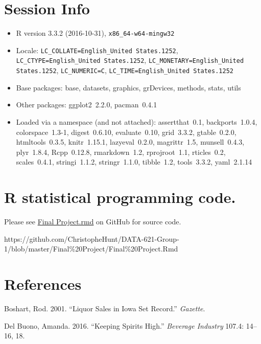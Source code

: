 \documentclass[]{elsarticle} %
\begin{document}
\section{Session Info}\label{session-info}

\begin{itemize}\raggedright
  \item R version 3.3.2 (2016-10-31), \verb|x86_64-w64-mingw32|
  \item Locale: \verb|LC_COLLATE=English_United States.1252|, \verb|LC_CTYPE=English_United States.1252|, \verb|LC_MONETARY=English_United States.1252|, \verb|LC_NUMERIC=C|, \verb|LC_TIME=English_United States.1252|
  \item Base packages: base, datasets, graphics, grDevices,
    methods, stats, utils
  \item Other packages: ggplot2~2.2.0, pacman~0.4.1
  \item Loaded via a namespace (and not attached): assertthat~0.1,
    backports~1.0.4, colorspace~1.3-1, digest~0.6.10,
    evaluate~0.10, grid~3.3.2, gtable~0.2.0, htmltools~0.3.5,
    knitr~1.15.1, lazyeval~0.2.0, magrittr~1.5, munsell~0.4.3,
    plyr~1.8.4, Rcpp~0.12.8, rmarkdown~1.2, rprojroot~1.1,
    rticles~0.2, scales~0.4.1, stringi~1.1.2, stringr~1.1.0,
    tibble~1.2, tools~3.3.2, yaml~2.1.14
\end{itemize}

\section{R statistical programming
code.}\label{r-statistical-programming-code.}

Please see
\href{https://github.com/ChristopheHunt/DATA-621-Group-1/blob/master/Final\%20Project/Final\%20Project.Rmd}{Final
Project.rmd} on GitHub for source code.

https://github.com/ChristopheHunt/DATA-621-Group-1/blob/master/Final\%20Project/Final\%20Project.Rmd

\section*{References}\label{references}

\hypertarget{refs}{}
\hypertarget{ref-IowaSetsRecord2}{}
Boshart, Rod. 2001. ``Liquor Sales in Iowa Set Record.'' \emph{Gazette}.

\hypertarget{ref-KeepingSpiritsHigh1}{}
Del Buono, Amanda. 2016. ``Keeping Spirits High.'' \emph{Beverage
Industry} 107.4: 14--16, 18.
\end{document}
